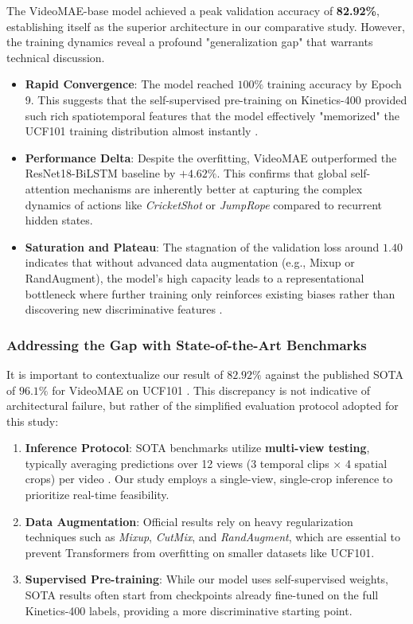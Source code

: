 The VideoMAE-base model achieved a peak validation accuracy of \textbf{82.92\%}, establishing itself as the superior architecture in our comparative study. However, the training dynamics reveal a profound "generalization gap" that warrants technical discussion.


\begin{itemize}
    \item \textbf{Rapid Convergence}: The model reached $100\%$ training accuracy by Epoch 9. This suggests that the self-supervised pre-training on Kinetics-400 provided such rich spatiotemporal features that the model effectively "memorized" the UCF101 training distribution almost instantly \cite{Tong2022}.
    \item \textbf{Performance Delta}: Despite the overfitting, VideoMAE outperformed the ResNet18-BiLSTM baseline by $+4.62\%$. This confirms that global self-attention mechanisms are inherently better at capturing the complex dynamics of actions like \textit{CricketShot} or \textit{JumpRope} compared to recurrent hidden states.
    \item \textbf{Saturation and Plateau}: The stagnation of the validation loss around $1.40$ indicates that without advanced data augmentation (e.g., Mixup or RandAugment), the model's high capacity leads to a representational bottleneck where further training only reinforces existing biases rather than discovering new discriminative features \cite{Tong2022}.
\end{itemize}

\subsubsection{Addressing the Gap with State-of-the-Art Benchmarks}
It is important to contextualize our result of $82.92\%$ against the published SOTA of $96.1\%$ for VideoMAE on UCF101 \cite{Tong2022}. This discrepancy is not indicative of architectural failure, but rather of the simplified evaluation protocol adopted for this study:

\begin{enumerate}
    \item \textbf{Inference Protocol}: SOTA benchmarks utilize \textbf{multi-view testing}, typically averaging predictions over 12 views (3 temporal clips $\times$ 4 spatial crops) per video \cite{Tong2022}. Our study employs a single-view, single-crop inference to prioritize real-time feasibility.
    \item \textbf{Data Augmentation}: Official results rely on heavy regularization techniques such as \textit{Mixup}, \textit{CutMix}, and \textit{RandAugment}, which are essential to prevent Transformers from overfitting on smaller datasets like UCF101.
    \item \textbf{Supervised Pre-training}: While our model uses self-supervised weights, SOTA results often start from checkpoints already fine-tuned on the full Kinetics-400 labels, providing a more discriminative starting point.
\end{enumerate}

